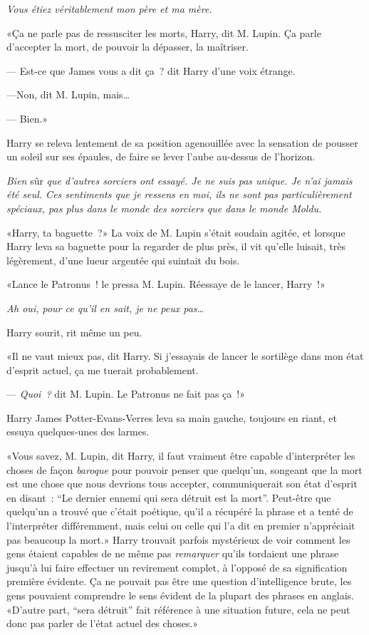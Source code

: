 \emph{Vous étiez véritablement mon père et ma mère.}

«Ça ne parle pas de ressusciter les morts, Harry, dit M. Lupin. Ça parle d'accepter la mort, de pouvoir la dépasser, la maîtriser.

--- Est-ce que James vous a dit ça~? dit Harry d'une voix étrange.

---Non, dit M. Lupin, mais…

--- Bien.»

Harry se releva lentement de sa position agenouillée avec la sensation de pousser un soleil sur ses épaules, de faire se lever l'aube au-dessus de l'horizon.

\emph{Bien} sûr \emph{que d'autres sorciers ont essayé. Je ne suis pas unique. Je n'ai jamais été seul. Ces sentiments que je ressens en moi, ils ne sont pas particulièrement spéciaux, pas plus dans le monde des sorciers que dans le monde Moldu.}

«Harry, ta baguette~?» La voix de M. Lupin s'était soudain agitée, et lorsque Harry leva sa baguette pour la regarder de plus près, il vit qu'elle luisait, très légèrement, d'une lueur argentée qui suintait du bois.

«Lance le Patronus~! le pressa M. Lupin. Réessaye de le lancer, Harry~!»

\emph{Ah oui, pour ce qu'il en sait, je ne peux pas…}

Harry sourit, rit même un peu.

«Il ne vaut mieux pas, dit Harry. Si j'essayais de lancer le sortilège dans mon état d'esprit actuel, ça me tuerait probablement.

--- \emph{Quoi~?} dit M. Lupin. Le Patronus ne fait pas ça~!»

Harry James Potter-Evans-Verres leva sa main gauche, toujours en riant, et essuya quelques-unes des larmes.

«Vous savez, M. Lupin, dit Harry, il faut vraiment être capable d'interpréter les choses de façon \emph{baroque} pour pouvoir penser que quelqu'un, songeant que la mort est une chose que nous devrions tous accepter, communiquerait son état d'esprit en disant~: “Le dernier ennemi qui sera détruit est la mort”. Peut-être que quelqu'un a trouvé que c'était poétique, qu'il a récupéré la phrase et a tenté de l'interpréter différemment, mais celui ou celle qui l'a dit en premier n'appréciait pas beaucoup la mort.» Harry trouvait parfois mystérieux de voir comment les gens étaient capables de ne même pas \emph{remarquer} qu'ils tordaient une phrase jusqu'à lui faire effectuer un revirement complet, à l'opposé de sa signification première évidente. Ça ne pouvait pas être une question d'intelligence brute, les gens pouvaient comprendre le sens évident de la plupart des phrases en anglais. «D'autre part, “sera détruit” fait référence à une situation future, cela ne peut donc pas parler de l'état actuel des choses.»

